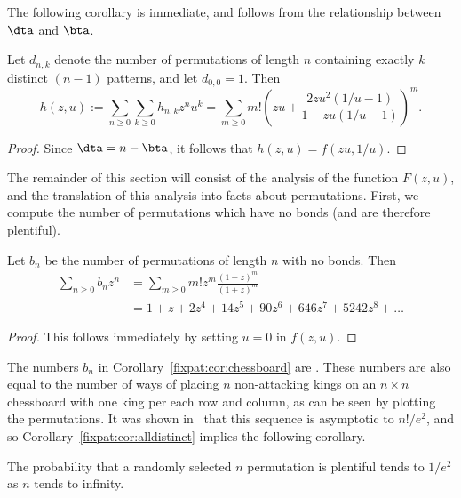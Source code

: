 \documentclass[12pt,twoside]{memoir}
\begin{document}
    The following corollary is immediate, and follows from the relationship
    between $\dta$ and $\bta$. 
      
    \begin{corollary} \label{fixpat:cor:gfn2}
      Let $d_{n,k}$ denote the number of permutations of length $n$ containing
      exactly $k$ distinct $(n-1)$ patterns, and let $d_{0,0} = 1$. Then 
      $$ h(z,u) :=  \sum_{n \geq 0}\sum_{ k \geq 0} h_{n,k} z^n u^k = 
        \sum_{m \geq 0}  m! \left( zu + 
        \frac{2zu^2 (1/u - 1)}{1 - zu(1/u - 1)}\right)^m.$$
    \end{corollary}
    \begin{proof}
      Since $\dta = n - \bta$, it follows that $h(z,u) = f(zu, 1/u)$. 
    \end{proof}

    The remainder of this section will consist of the analysis of the function
    $F(z,u)$, and the translation of this analysis into facts about
    permutations. 
    First, we compute the number of permutations which have no bonds (and
    are therefore plentiful). 

    \begin{proposition} \label{fixpat:cor:chessboard}
      Let $b_n$ be the number of permutations of length $n$ with no bonds. Then 
      $$ \begin{aligned} 
       \sum_{n \geq 0} b_n z^n 
         &= \sum_{m \geq 0} m! z^m \frac{(1 - z)^m}{(1 + z)^m} \\
         &= 1 + z + 2z^4 + 14z^5 + 90z^6 + 646z^7 + 5242z^8 + \dots 
      \end{aligned} $$
    \end{proposition}
    \begin{proof}
      This follows immediately by setting $u = 0$ in $f(z,u)$. 
    \end{proof}

    The numbers $b_n$ in Corollary~\ref{fixpat:cor:chessboard} are 
    . These numbers are also equal to the number of ways of
    placing $n$ non-attacking kings on an $n \times n$ chessboard with one king
    per each row and column, as can be seen by plotting the permutations. It
    was shown in~\cite{Tauraso2006} that this sequence is asymptotic to
    $n!/e^2$, and so Corollary~\ref{fixpat:cor:alldistinct} implies the
    following corollary. 

    \begin{corollary}
      The probability that a randomly selected $n$ permutation is plentiful tends
      to $1/e^2$ as $n$ tends to infinity. 
    \end{corollary}
\end{document}
